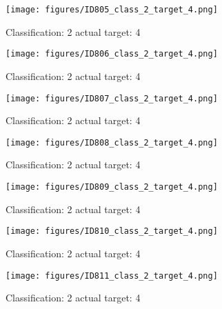\begin{figure}[h!]
\begin{center}
\texttt{[image: figures/ID805\_class\_2\_target\_4.png]}
\end{center}
\caption{ Classification: 2 actual target: 4}
\label{fig:ID805_class_2_target_4}
\end{figure}
\begin{figure}[h!]
\begin{center}
\texttt{[image: figures/ID806\_class\_2\_target\_4.png]}
\end{center}
\caption{ Classification: 2 actual target: 4}
\label{fig:ID806_class_2_target_4}
\end{figure}
\begin{figure}[h!]
\begin{center}
\texttt{[image: figures/ID807\_class\_2\_target\_4.png]}
\end{center}
\caption{ Classification: 2 actual target: 4}
\label{fig:ID807_class_2_target_4}
\end{figure}
\begin{figure}[h!]
\begin{center}
\texttt{[image: figures/ID808\_class\_2\_target\_4.png]}
\end{center}
\caption{ Classification: 2 actual target: 4}
\label{fig:ID808_class_2_target_4}
\end{figure}
\begin{figure}[h!]
\begin{center}
\texttt{[image: figures/ID809\_class\_2\_target\_4.png]}
\end{center}
\caption{ Classification: 2 actual target: 4}
\label{fig:ID809_class_2_target_4}
\end{figure}
\begin{figure}[h!]
\begin{center}
\texttt{[image: figures/ID810\_class\_2\_target\_4.png]}
\end{center}
\caption{ Classification: 2 actual target: 4}
\label{fig:ID810_class_2_target_4}
\end{figure}
\begin{figure}[h!]
\begin{center}
\texttt{[image: figures/ID811\_class\_2\_target\_4.png]}
\end{center}
\caption{ Classification: 2 actual target: 4}
\label{fig:ID811_class_2_target_4}
\end{figure}
